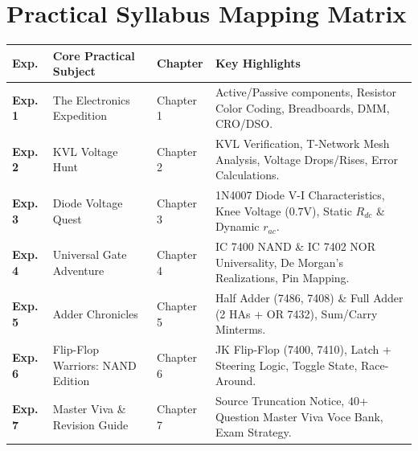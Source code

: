 \documentclass[a4paper,11pt,oneside,openany]{book}
\begin{document}
\section*{Practical Syllabus Mapping Matrix}
\begin{table}[htbp]
\centering
\small
\begin{tabularx}{\textwidth}{lp{5.2cm}p{2.2cm}X}
\toprule
\textbf{Exp.} & \textbf{Core Practical Subject} & \textbf{Chapter} & \textbf{Key Highlights} \\
\midrule
\textbf{Exp. 1} & The Electronics Expedition & Chapter 1 & Active/Passive components, Resistor Color Coding, Breadboards, DMM, CRO/DSO. \\
\addlinespace
\textbf{Exp. 2} & KVL Voltage Hunt & Chapter 2 & KVL Verification, T-Network Mesh Analysis, Voltage Drops/Rises, Error Calculations. \\
\addlinespace
\textbf{Exp. 3} & Diode Voltage Quest & Chapter 3 & 1N4007 Diode V-I Characteristics, Knee Voltage ($0.7\text{V}$), Static $R_{dc}$ \& Dynamic $r_{ac}$. \\
\addlinespace
\textbf{Exp. 4} & Universal Gate Adventure & Chapter 4 & IC 7400 NAND \& IC 7402 NOR Universality, De Morgan's Realizations, Pin Mapping. \\
\addlinespace
\textbf{Exp. 5} & Adder Chronicles & Chapter 5 & Half Adder (7486, 7408) \& Full Adder (2 HAs + OR 7432), Sum/Carry Minterms. \\
\addlinespace
\textbf{Exp. 6} & Flip-Flop Warriors: NAND Edition & Chapter 6 & JK Flip-Flop (7400, 7410), Latch + Steering Logic, Toggle State, Race-Around. \\
\addlinespace
\textbf{Exp. 7} & Master Viva \& Revision Guide & Chapter 7 & Source Truncation Notice, 40+ Question Master Viva Voce Bank, Exam Strategy. \\
\bottomrule
\end{tabularx}
\end{table}

\clearpage

\tableofcontents
\cleardoublepage

\mainmatter








\end{document}
